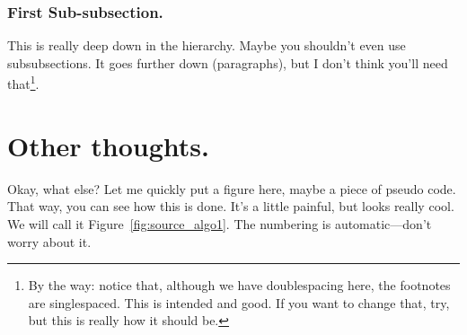 \documentclass[12pt]{report}
\begin{document}
	\subsubsection{First Sub-subsection.}
	This is really deep down in the hierarchy. Maybe you shouldn't even
	use sub\-subsections. It goes further down (paragraphs), but I don't
	think you'll need that\footnote{By the way: notice that, although we
		have doublespacing here, the footnotes are singlespaced. This is
		intended and good. If you want to change that, try, but this is really
		how it should be.}.
	
	\section{Other thoughts.}
	Okay, what else?
	Let me quickly put a figure here, maybe a piece of pseudo code.
	That way, you can see how this is done. It's a little painful, but
	looks really cool. We will call it Figure~\ref{fig:source_algo1}. The
	numbering is automatic---don't worry about it.
	
	\newcommand{\T}{\hspace*{5mm}}
	
\end{document}
